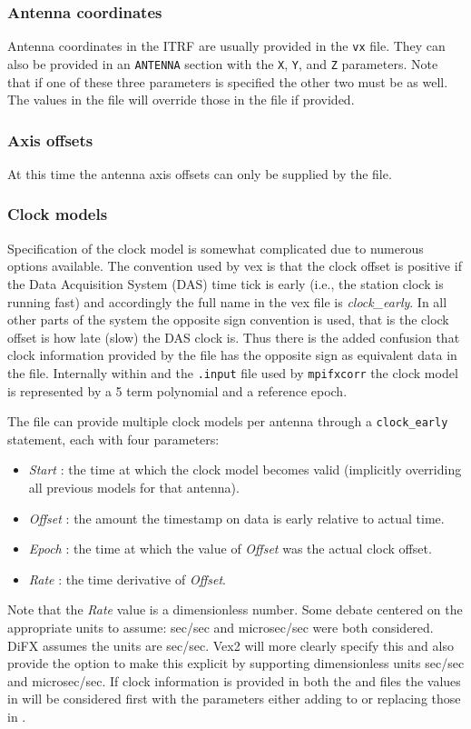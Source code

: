 \documentclass[12pt]{article}
\begin{document}
\subsubsection{Antenna coordinates}

Antenna coordinates in the ITRF are usually provided in the {\tt vx} file.
They can also be provided in an {\tt ANTENNA} section with the {\tt X}, {\tt Y}, and {\tt Z} parameters.
Note that if one of these three parameters is specified the other two must be as well.
The values in the \vd file will override those in the \vx file if provided.


\subsubsection{Axis offsets}

At this time the antenna axis offsets can only be supplied by the \vx file.

\subsubsection{Clock models}

Specification of the clock model is somewhat complicated due to numerous options available.
The convention used by vex is that the clock offset is positive if the Data Acquisition System (DAS) time tick is early (i.e., the station clock is running fast) and accordingly the full name in the vex file is {\em clock\_early}.
In all other parts of the system the opposite sign convention is used, that is the clock offset is how late (slow) the DAS clock is.
Thus there is the added confusion that clock information provided by the \vd file has the opposite sign as equivalent data in the \vx file.
Internally within \vexdifx and the {\tt .input} file used by {\tt mpifxcorr} the clock model is represented by a 5 term polynomial and a reference epoch.

The \vx file can provide multiple clock models per antenna through a {\tt clock\_early} statement, each with four parameters:
\begin{itemize}
\item {\em Start} : the time at which the clock model becomes valid (implicitly overriding all previous models for that antenna).
\item {\em Offset} : the amount the timestamp on data is early relative to actual time.
\item {\em Epoch} : the time at which the value of {\em Offset} was the actual clock offset.
\item {\em Rate} : the time derivative of {\em Offset}.
\end{itemize}
Note that the {\em Rate} value is a dimensionless number.
Some debate centered on the appropriate units to assume: sec/sec and microsec/sec were both considered.
DiFX assumes the units are sec/sec.
Vex2 will more clearly specify this and also provide the option to make this explicit by supporting dimensionless units sec/sec and microsec/sec.
If clock information is provided in both the \vx and \vd files the values in \vx will be considered first with the \vd parameters either adding to or replacing those in \vx.
\end{document}
